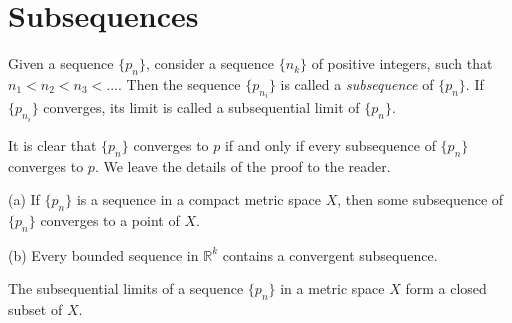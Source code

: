
\section{Subsequences}
\begin{myDef}\label{myDef:3.5}
    Given a sequence $\{p_n\}$, consider a sequence $\{n_k\}$ of positive integers, such that $n_1 <n_2 <n_3 <....$ Then the sequence $\{p_{n_i}\}$ is called a \emph{subsequence} of $\{p_n\}$. If $\{p_{n_i}\}$ converges, its limit is called a subsequential limit of $\{p_n\}$.
\end{myDef}
It is clear that $\{p_n\}$ converges to $p$ if and only if every subsequence of $\{p_{n}\}$ converges to $p$. We leave the details of the proof to the reader.

\begin{thm}\label{thm:3.6}
    (a) If $\{p_{n}\}$ is a sequence in a compact metric space $X$, then some subsequence of $\{p_{n}\}$ converges to a point of $X$.

    (b) Every bounded sequence in $\mathbb{R}^k$ contains a convergent subsequence.
\end{thm}

\begin{thm}\label{thm:3.7}
    The subsequential limits of a sequence $\{p_{n}\}$  in a metric space $X$ form a closed subset of $X$.
\end{thm}

